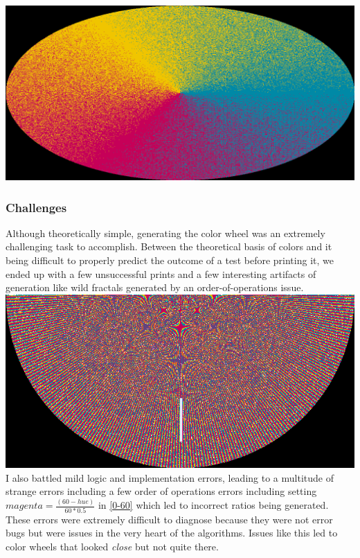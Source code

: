\documentclass{article}
\begin{document}
\begin{multicols}{2}
\noindent
\includegraphics[width=\columnwidth]{color-wheel-scaled}

\subsubsection{Challenges}

Although theoretically simple, generating the color wheel was an extremely challenging task to accomplish. Between the theoretical basis of colors and it being difficult to properly predict the outcome of a test before printing it, we ended up with a few unsuccessful prints and a few interesting artifacts of generation like wild fractals generated by an order-of-operations issue.
\\

\noindent
\includegraphics[width=\columnwidth]{artifact}
\\

\noindent
I also battled mild logic and implementation errors, leading to a multitude of strange errors including a few order of operations errors including setting $magenta=\frac{(60-hue)}{60 * 0.5}$ in \ref{0-60} which led to incorrect ratios being generated. These errors were extremely difficult to diagnose because they were not error bugs but were issues in the very heart of the algorithms. Issues like this led to color wheels that looked \textit{close} but not quite there.
\\


\end{multicols}
\end{document}
